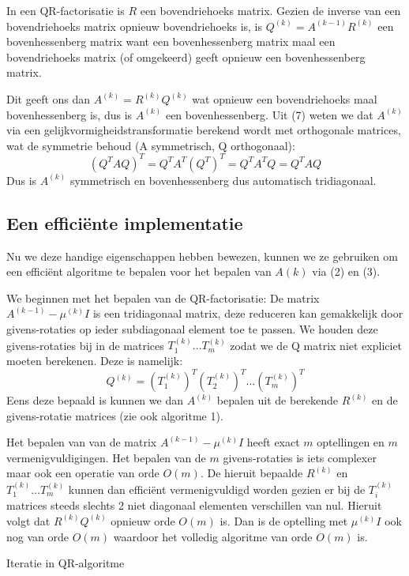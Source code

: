 \documentclass[a4paper]{article}
\begin{document}
	\noindent In een QR-factorisatie is $R$ een bovendriehoeks matrix. Gezien de inverse van een bovendriehoeks matrix opnieuw bovendriehoeks is, is $Q^{(k)} = A^{(k-1)}R^{(k)}$ een bovenhessenberg matrix want een bovenhessenberg matrix maal een bovendriehoeks matrix (of omgekeerd) geeft opnieuw een bovenhessenberg matrix.
	
	\noindent Dit geeft ons dan $A^{(k)} = R^{(k)}Q^{(k)}$ wat opnieuw een bovendriehoeks maal bovenhessenberg is, dus is $A^{(k)}$ een bovenhessenberg. Uit (7) weten we dat $A^{(k)}$ via een gelijkvormigheidstransformatie berekend wordt met orthogonale matrices, wat de symmetrie behoud (A symmetrisch, Q orthogonaal):
	\[
		(Q^TAQ)^T = Q^TA^T(Q^T)^T = Q^TA^TQ = Q^TAQ
	\]
	Dus is $A^{(k)}$ symmetrisch en bovenhessenberg dus automatisch tridiagonaal.
\subsection{Een efficiënte implementatie}
Nu we deze handige eigenschappen hebben bewezen, kunnen we ze gebruiken om een efficiënt algoritme te bepalen voor het bepalen van $A(k)$ via (2) en (3).

\noindent We beginnen met het bepalen van de QR-factorisatie: De matrix $A^{(k-1)} - \mu ^{(k)}I$ is een tridiagonaal matrix, deze reduceren kan gemakkelijk door givens-rotaties op ieder subdiagonaal element toe te passen. We houden deze givens-rotaties bij in de matrices $T^{(k)}_1\dots T^{(k)}_m$ zodat we de Q matrix niet expliciet moeten berekenen. Deze is namelijk:
\[
	Q^{(k)} = (T^{(k)}_1)^T(T^{(k)}_2)^T \dots (T^{(k)}_m)^T 
\]
Eens deze bepaald is kunnen we dan $A^{(k)}$ bepalen uit de berekende $R^{(k)}$ en de givens-rotatie matrices (zie ook algoritme 1). 

\noindent Het bepalen van van de matrix  $A^{(k-1)} - \mu ^{(k)}I$ heeft exact $m$ optellingen en $m$ vermenigvuldigingen.
Het bepalen van de $m$ givens-rotaties is iets complexer maar ook een operatie van orde $O(m)$. De hieruit bepaalde $R^{(k)}$ en $T^{(k)}_1\dots T^{(k)}_m$ kunnen dan efficiënt vermenigvuldigd worden gezien er bij de $T^{(k)}_i$ matrices steeds slechts 2 niet diagonaal elementen verschillen van nul. Hieruit volgt dat $R^{(k)}Q^{(k)}$ opnieuw orde $O(m)$ is. Dan is de optelling met $\mu ^{(k)}I$ ook nog van orde $O(m)$ waardoor het volledig algoritme van orde $O(m)$ is.

\begin{algorithm}[H]
	\caption{Iteratie in QR-algoritme}
\end{algorithm}
\end{document}
